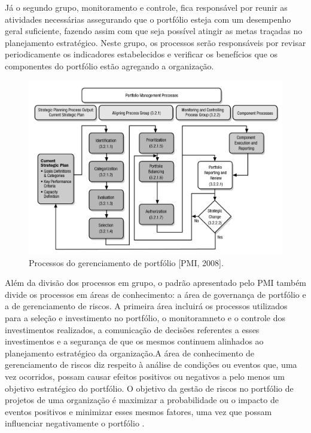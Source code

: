 \documentclass[a4paper,10pt]{article}
\begin{document}
\flushleft
Já o segundo grupo, monitoramento e controle, fica responsável por reunir as atividades necessárias assegurando que o portfólio
esteja com um desempenho geral suficiente, fazendo assim com que seja possível atingir as metas traçadas no planejamento estratégico. Neste grupo, 
os processos serão responsáveis por revisar periodicamente os indicadores estabelecidos e verificar os benefícios que os componentes do portfólio estão agregando a organização.

\begin{figure}
\centering
\includegraphics[width=.7\textwidth]{modelo_pmi.jpg}
\caption{Processos do gerenciamento de portfólio [PMI, 2008].}
\end{figure}

\flushleft
Além da divisão dos processos em grupo, o padrão apresentado pelo PMI também divide os processos em áreas de conhecimento: a área de governança de portfólio e a de gerenciamento de riscos.
A primeira área incluirá os processos utilizados para a seleção e investimento no portfólio, o monitoramneto e o controle dos investimentos realizados, a comunicação de decisões referentes 
a esses investimentos e a segurança de que os mesmos continuem alinhados ao planejamento estratégico da organização.A área de conhecimento de gerenciamento de riscos diz respeito à análise 
de condições ou eventos que, uma vez ocorridos, possam causar efeitos positivos ou negativos a pelo menos um objetivo estratégico do portfólio. O objetivo da gestão de riscos no portfólio
de projetos de uma organização é maximizar a probabilidade ou o impacto de eventos positivos e minimizar esses mesmos fatores, uma vez que possam influenciar negativamente o portfólio \cite{sppm}.
\end{document}
